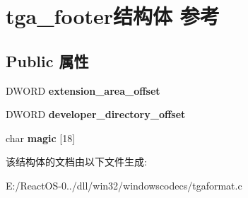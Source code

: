 \hypertarget{structtga__footer}{}\section{tga\+\_\+footer结构体 参考}
\label{structtga__footer}
\subsection*{Public 属性}
\begin{DoxyCompactItemize}
\item 
\mbox{\label{structtga__footer_a6ad88a362f98ef90e8a67e7ad78b95cb}} 
D\+W\+O\+RD {\bfseries extension\+\_\+area\+\_\+offset}
\item 
\mbox{\label{structtga__footer_aac0137bf30f70327eaafbc3b65d76091}} 
D\+W\+O\+RD {\bfseries developer\+\_\+directory\+\_\+offset}
\item 
\mbox{\label{structtga__footer_aeaf3235b1ba24631663ceb4ec350be29}} 
char {\bfseries magic} \mbox{[}18\mbox{]}
\end{DoxyCompactItemize}


该结构体的文档由以下文件生成\+:\begin{DoxyCompactItemize}
\item 
E\+:/\+React\+O\+S-\/0../dll/win32/windowscodecs/tgaformat.\+c\end{DoxyCompactItemize}
